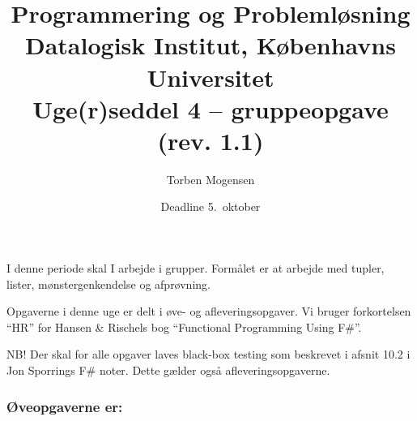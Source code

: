 \documentclass[a4paper]{article}
\begin{document}
\title{Programmering og Problemløsning\\
Datalogisk Institut, Københavns Universitet\\
Uge(r)seddel 4 -- gruppeopgave (rev. 1.1)}

\author{Torben Mogensen}
\date{Deadline 5.\ oktober}

\maketitle

\noindent
I denne periode skal I arbejde i grupper.  Formålet er at arbejde med
tupler, lister, mønstergenkendelse og afprøvning.

Opgaverne i denne uge er delt i øve- og afleveringsopgaver.  Vi
bruger forkortelsen ``HR'' for Hansen \& Rischels bog ``Functional
Programming Using F\#''.

NB! Der skal for alle opgaver laves black-box testing som beskrevet i
afsnit 10.2 i Jon Sporrings F\#{} noter.  Dette gælder også afleveringsopgaverne.

\subsubsection*{Øveopgaverne er:}
\end{document}
